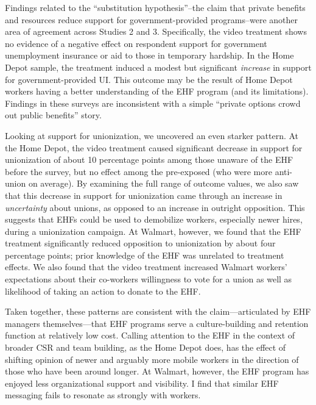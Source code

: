 \documentclass[
  11pt,
  oneside]{article}
\begin{document}
Findings related to the ``substitution hypothesis''--the claim that private benefits and resources reduce support for government-provided programs--were another area of agreement across Studies 2 and 3. Specifically, the video treatment shows no evidence of a negative effect on respondent support for government unemployment insurance or aid to those in temporary hardship. In the Home Depot sample, the treatment induced a modest but significant \emph{increase} in support for government-provided UI. This outcome may be the result of Home Depot workers having a better understanding of the EHF program (and its limitations). Findings in these surveys are inconsistent with a simple ``private options crowd out public benefits'' story.

Looking at support for unionization, we uncovered an even starker pattern. At the Home Depot, the video treatment caused significant decrease in support for unionization of about 10 percentage points among those unaware of the EHF before the survey, but no effect among the pre-exposed (who were more anti-union on average). By examining the full range of outcome values, we also saw that this decrease in support for unionization came through an increase in \emph{uncertainty} about unions, as opposed to an increase in outright opposition. This suggests that EHFs could be used to demobilize workers, especially newer hires, during a unionization campaign. At Walmart, however, we found that the EHF treatment significantly reduced opposition to unionization by about four percentage points; prior knowledge of the EHF was unrelated to treatment effects. We also found that the video treatment increased Walmart workers' expectations about their co-workers willingness to vote for a union as well as likelihood of taking an action to donate to the EHF.

Taken together, these patterns are consistent with the claim---articulated by EHF managers themselves---that EHF programs serve a culture-building and retention function at relatively low cost. Calling attention to the EHF in the context of broader CSR and team building, as the Home Depot does, has the effect of shifting opinion of newer and arguably more mobile workers in the direction of those who have been around longer. At Walmart, however, the EHF program has enjoyed less organizational support and visibility. I find that similar EHF messaging fails to resonate as strongly with workers.
\end{document}
